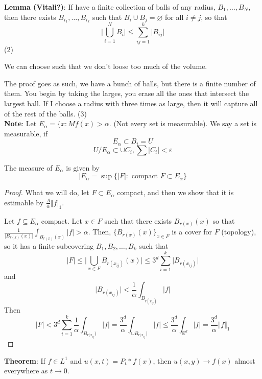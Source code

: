\documentclass[12pt]{article}
\let\emptyset\varnothing
\begin{document}
\noindent \textbf{Lemma (Vitali?)}: If have a finite  collection of balls of any radius, $B_1, \dots, B_N$, then there exists $B_{i_1}, \dots, B_{i_k}$ such that $B_i \cup B_j = \emptyset$ for all $i \not = j$,  so that 
$$\vert \bigcup_{i=1}^N B_i \vert \leq  \sum^k_{ij=1}\vert B_{ij}\vert$$
(2) 

We can choose such that we don't loose too much of the volume. 

The proof goes as such, we have a bunch of balls, but there is a finite number of them. You begin by taking the larges, you erase all the ones that intersect the largest ball. If I choose a radius with three times as large, then  it will capture all of the rest of the balls. (3) \\


\noindent\textbf{Note}: Let $E_\alpha = \{ x : Mf(x) > \alpha$. (Not every set is measurable). We say a set is measurable, if 
$$E_{\alpha} \subset B_i = U$$
$$U / E_\alpha \subset \cup C_i, \sum\vert C_i \vert < \varepsilon$$

The measure of $E_\alpha$ is given by 
$$\vert E_\alpha = \sup\{\vert F \vert : \text{ compact } F \subset E_\alpha\}$$
\begin{proof}
What we will do, let $F \subset E_\alpha$ compact, and then we show that it is estimable by $\frac{A}{\alpha}\Vert f \vert_1$. 

Let $f \subseteq E_\alpha$ compact. Let $x \in F$ such that there exists $B_{r(x)}(x)$ so that $\frac{1}{\vert B_{r(x)}(x)\vert } \int_{B_{r(x)}(x)} \vert f \vert > \alpha$. Then, $\{B_{r(x)}(x)\}_{x \in F}$ is a cover for $F$ (topology), so it has a finite subcovering $B_1, B_2, \dots, B_k$ such that
$$\vert F \vert \leq \vert \bigcup_{x\in F} B_{r(x_{ij})}(x) \vert \leq 3^d \sum^k_{i=1} \vert B_{r(x_{ij})} \vert$$
and 
$$\vert B_{r(x_{ij})}\vert <\frac{1}{\alpha} \int_{B_{r(x_{ij})}} \vert f \vert$$
Then 
$$\vert F \vert < 3^d \sum^k_{i=1} \frac{1}{\alpha} \int_{B_{r(x_{ij}})} \vert f \vert = \frac{3^d}{\alpha}  \int_{\cup B_{r(x_{ij}})} \vert f \vert \leq \frac{3^d}{\alpha} \int_{\mathbb{R}^d} \vert f \vert = \frac{3^d}{\alpha} \Vert f\Vert_1$$
\end{proof}

\textbf{Theorem}: If $f \in L^1$ and $u(x,t) = P_t * f(x)$, then $u(x,y) \rightarrow f(x)$ almost everywhere as $t \rightarrow 0$. 
\end{document}
